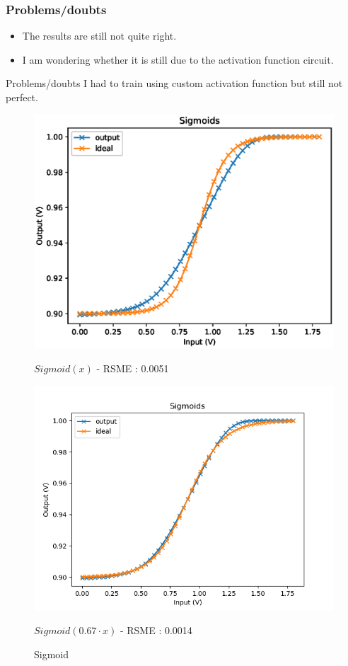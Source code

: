 \documentclass[table]{beamer}
\begin{document}
\begin{frame}
  \frametitle{Problems/doubts}
  \begin{itemize}
    \item The results are still not quite right.
    \item I am wondering whether it is still due to the activation function circuit.
  \end{itemize}
\end{frame}

\begin{frame}{Problems/doubts}
  I had to train using custom activation function but still not perfect.
  \begin{figure}[!tbp]
    \centering
    \begin{minipage}[b]{0.4\textwidth}
      \centering
      \includegraphics[width=\textwidth]{activation/sigmoid}
      \caption{ $Sigmoid(x)$ - RSME : 0.0051}
    \end{minipage}
    \hspace{20pt}
    \begin{minipage}[b]{0.4\textwidth}
      \centering
      \includegraphics[width=\textwidth]{activation/cSigmoid}
      \caption{ $ Sigmoid(0.67\cdot x) $ - RSME : 0.0014}
    \end{minipage}
    \caption{Sigmoid}
  \end{figure}
\end{frame}
\end{document}
